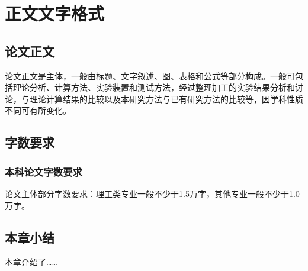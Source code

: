 \clearpage
{}
\section{正文文字格式}
\subsection{论文正文}
论文正文是主体，一般由标题、文字叙述、图、表格和公式等部分构成。一般可包括理论分析、计算方法、实验装置和测试方法，经过整理加工的实验结果分析和讨论，与理论计算结果的比较以及本研究方法与已有研究方法的比较等，因学科性质不同可有所变化。\par

\subsection{字数要求}
\subsubsection{本科论文字数要求}
论文主体部分字数要求：理工类专业一般不少于1.5万字，其他专业一般不少于1.0万字。

\subsection{本章小结}
本章介绍了……
